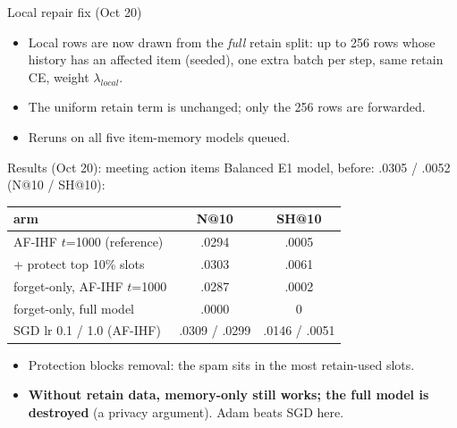 \documentclass{beamer}
\begin{document}
\begin{frame}{Local repair fix (Oct 20)}
\begin{itemize}
  \item Local rows are now drawn from the \emph{full} retain split: up to 256
        rows whose history has an affected item (seeded), one extra batch per
        step, same retain CE, weight $\lambda_{local}$.
  \item The uniform retain term is unchanged; only the 256 rows are forwarded.
  \item Reruns on all five item-memory models queued.
\end{itemize}
\end{frame}

\begin{frame}{Results (Oct 20): meeting action items}
Balanced E1 model, before: .0305 / .0052 (N@10 / SH@10):
\begin{center}
\footnotesize\setlength{\tabcolsep}{3pt}
\begin{tabular}{|l|c|c|}
\hline
arm & N@10 & SH@10 \\
\hline
AF-IHF $t$=1000 (reference)        & .0294 & .0005 \\
\quad + protect top 10\% slots   & .0303 & \alert{.0061} \\
forget-only, AF-IHF $t$=1000       & .0287 & .0002 \\
forget-only, full model            & \alert{.0000} & 0 \\
SGD lr 0.1 / 1.0 (AF-IHF)          & .0309 / .0299 & \alert{.0146 / .0051} \\
\hline
\end{tabular}
\end{center}
\begin{itemize}
  \item Protection blocks removal: the spam sits in the most retain-used slots.
  \item \textbf{Without retain data, memory-only still works; the full model is
        destroyed} (a privacy argument). Adam beats SGD here.
\end{itemize}
\end{frame}
\end{document}
